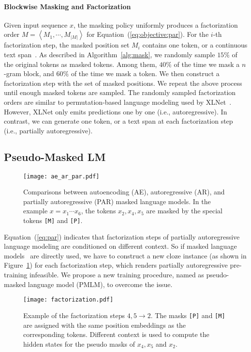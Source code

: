 \documentclass{article}
\newcommand{\eqform}[1]{Equation~(\ref{#1})}
\newcommand\pmlmfull{pseudo-masked language model}
\newcommand\pmlm{\textsc{PMLM}}
\newcommand{\sptk}[1]{\texttt{[#1]}}
\begin{document}
\paragraph{Blockwise Masking and Factorization}
Given input sequence $x$, the masking policy uniformly produces a factorization order ${M}=\left< M_1 , \cdots , M_{|{M}|} \right>$ for \eqform{eq:objective:par}.
For the $i$-th factorization step, the masked position set $M_i$ contains one token, or a continuous text span~\cite{spanbert}.
As described in Algorithm~\ref{alg:mask}, we randomly sample $15\%$ of the original tokens as masked tokens.
Among them, $40\%$ of the time we mask a $n$-gram block, and $60\%$ of the time we mask a token. We then construct a factorization step with the set of masked positions.
We repeat the above process until enough masked tokens are sampled.
The randomly sampled factorization orders are similar to permutation-based language modeling used by XLNet~\cite{xlnet}. However, XLNet only emits predictions one by one (i.e., autoregressive).
In contrast, we can generate one token, or a text span at each factorization step (i.e., partially autoregressive).


\subsection{Pseudo-Masked LM}
\label{sec:pseudo}


\begin{figure}[t]
\centering
\texttt{[image: ae\_ar\_par.pdf]}
\caption{
Comparisons between autoencoding (AE), autoregressive (AR), and partially autoregressive (PAR) masked language models.
In the example $x=x_1\cdots x_6$, the tokens $x_2,x_4,x_5$ are masked by the special tokens \sptk{M} and \sptk{P}.
}
\label{fig:ae_ar_par}
\end{figure}


\eqform{eq:par} indicates that factorization steps of partially autoregressive language modeling are conditioned on different context.
So if masked language models~\cite{bert} are directly used, we have to construct a new cloze instance (as shown in Figure~\ref{fig:ae_ar_par}) for each factorization step, which renders partially autoregressive pre-training infeasible.
We propose a new training procedure, named as \pmlmfull{} (\pmlm{}), to overcome the issue.


\begin{figure}[t]
\centering
\texttt{[image: factorization.pdf]}
\caption{
Example of the factorization steps $4,5 \rightarrow 2$.
The masks \sptk{P} and \sptk{M} are assigned with the same position embeddings as the corresponding tokens.
Different context is used to compute the hidden states for the pseudo masks of $x_4,x_5$ and $x_2$.
}
\label{fig:pmlm}
\end{figure}
\end{document}
